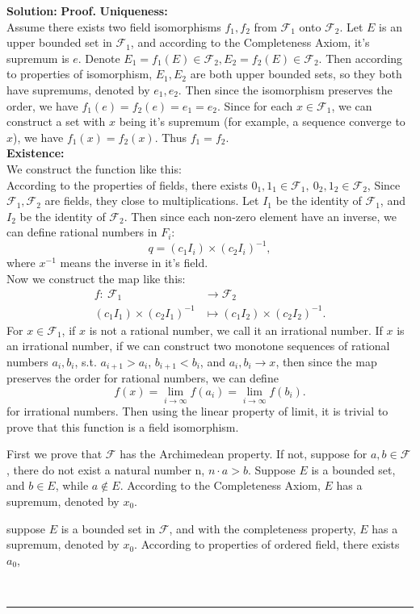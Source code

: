\documentclass{article}%
\newenvironment{proof}[1][Proof]{\textbf{#1.} }{\ \rule{0.5em}{0.5em}}
\begin{document}
\begin{enumerate}
\textbf{Solution:} 
\begin{proof}
\textbf{Uniqueness:} \\
Assume there exists two field isomorphisms $f_1, f_2$ from $\mathcal{F}_1$ onto $\mathcal{F}_2$. Let $E$ is an upper bounded set in $\mathcal{F}_1$, and according to the Completeness Axiom, it's supremum is $e$. Denote $E_1 = f_1(E)\in \mathcal{F}_2, E_2 = f_2(E)\in\mathcal{F}_2$. Then according to properties of isomorphism, $E_1, E_2$ are both upper bounded sets, so they both have supremums, denoted by $e_1, e_2$. Then since the isomorphism preserves the order, we have $f_1(e) = f_2(e) = e_1 = e_2$. Since for each $x\in \mathcal{F}_1$, we can construct a set with $x$ being it's supremum (for example, a sequence converge to $x$), we have $f_1(x) = f_2(x)$. Thus $f_1 = f_2$. \\[5pt]
\textbf{Existence:} \\
We construct the function like this: \\
According to the properties of fields, there exists $0_1, 1_1\in \mathcal{F}_1,~ 0_2, 1_2\in \mathcal{F}_2$, 
Since $\mathcal{F}_1, \mathcal{F}_2$ are fields, they close to multiplications. Let $I_1$ be the identity of $\mathcal{F}_1$, and $I_2$ be the identity of $\mathcal{F}_2$. Then since each non-zero element have an inverse, we can define rational numbers in $F_i$:
$$
q = (c_1I_i)\times (c_2I_i)^{-1},
$$
where $x^{-1}$ means the inverse in it's field. \\
Now we construct the map like this: \\
$$
\begin{aligned}
f: ~\mathcal{F}_1&\to\mathcal{F}_2 \\
(c_1I_1)\times(c_2I_1)^{-1} &\mapsto (c_1I_2)\times(c_2I_2)^{-1}.
\end{aligned}
$$
For $x \in \mathcal{F}_1$, if $x$ is not a rational number, we call it an irrational number. 
If $x$ is an irrational number, if we can construct two monotone sequences of rational numbers ${a_i}, {b_i}$, s.t. $a_{i+1}>a_{i}$, $b_{i+1} < b_{i}$, and ${a_i}, {b_i} \to x$, then since the map preserves the order for rational numbers, we can define 
$$
f(x) = \lim_{i\to\infty}f(a_i) = \lim_{i\to\infty}f(b_i).
$$
for irrational numbers. Then using the linear property of limit, it is trivial to prove that this function is a field isomorphism.

First we prove that $\mathcal{F}$ has the Archimedean property. If not, suppose for $a, b\in \mathcal{F}$, there do not exist a natural number n, $n\cdot a > b$. Suppose $E$ is a bounded set, and $b \in E$, while $a \notin E$. According to the Completeness Axiom, $E$ has a supremum, denoted by $x_0$. 


suppose $E$ is a bounded set in $\mathcal{F}$, and with the completeness property, $E$ has a supremum, denoted by $x_0$. 
According to properties of ordered field, there exists $a_0$, 

\end{proof}
\bigskip


\end{enumerate}
\end{document}
